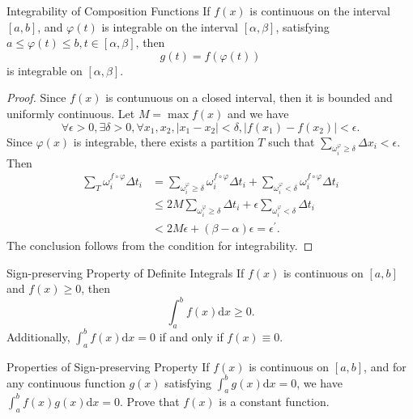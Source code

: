 \begin{proposition}{Integrability of Composition Functions}{}
  If $f(x)$ is continuous on the interval $[a, b]$,
  and $\varphi(t)$ is integrable on the interval $[\alpha, \beta]$,
  satisfying $a \leq \varphi(t) \leq b, t \in [\alpha, \beta]$,
  then
  \begin{equation}
    g(t) = f(\varphi(t))
  \end{equation}
  is integrable on $[\alpha, \beta]$.
\end{proposition}

\begin{proof}
  Since $f(x)$ is contunuous on a closed interval, then it is bounded and
  uniformly continuous. Let $M = \max f(x)$ and we have
  \begin{equation}
    \forall \epsilon > 0, \exists \delta > 0, \forall x_1, x_2, |x_1 - x_2| < \delta,
    |f(x_1) - f(x_2)| < \epsilon.
  \end{equation}
  Since $\varphi(x)$ is integrable, there exists a partition $T$ such that
  $\sum \limits_{\omega_i^{\varphi} \geq \delta} \Delta x_i < \epsilon$.
  Then
  \begin{align}
    \sum\limits_T \omega_i^{f \circ \varphi} \Delta t_i &= \sum\limits_{\omega_i^{\varphi} \geq \delta} \omega_i^{f \circ \varphi} \Delta t_i + \sum\limits_{\omega_i^{\varphi} < \delta} \omega_i^{f \circ \varphi} \Delta t_i\\
    &\leq 2M \sum\limits_{\omega_i^{\varphi} \geq \delta} \Delta t_i + \epsilon \sum\limits_{\omega_i^{\varphi} < \delta} \Delta t_i\\
    &< 2M \epsilon + (\beta - \alpha)\epsilon = \epsilon^{\prime}.
  \end{align}
  The conclusion follows from the condition for integrability.
\end{proof}

\begin{proposition}{Sign-preserving Property of Definite Integrals}{}
  If $f(x)$ is continuous on $[a, b]$ and $f(x) \geq 0$, then
  \begin{equation}
    \int_a^b f(x)\mathrm{d} x \geq 0.
  \end{equation}
  Additionally, $\int_a^b f(x)\mathrm{d} x = 0$ if and only if $f(x) \equiv 0$.
\end{proposition}

\begin{example}{Properties of Sign-preserving Property}{}
  If $f(x)$ is continuous on $[a, b]$, and for any continuous function $g(x)$
  satisfying $\int_a^b g(x)\mathrm{d} x= 0$, we have $\int_a^bf(x)g(x)\mathrm{d}
  x= 0$. Prove that $f(x)$ is a constant function.
\end{example}

